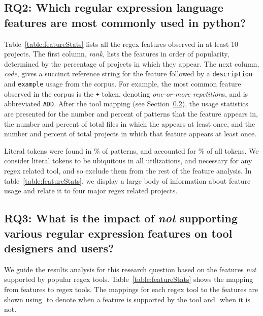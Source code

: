 \subsection{RQ2: Which regular expression language features are most commonly used in python?}
Table~\ref{table:featureStats}  lists all the regex features observed in at least 10 projects.
The first column, \emph{rank}, lists the features in order of popularity, determined by the percentage of projects in which they appear. The next column, \emph{code}, gives a succinct reference string for the feature followed by a {\tt description} and {\tt example} usage from the corpus. For example, the most common feature observed in the corpus is the {\tt +} token, denoting \emph{one-or-more repetition}s, and is abbreviated {\tt ADD}.
After the tool mapping (see Section~\ref{results:rq3}), the usage statistics are presented for the number and percent of patterns that the feature appears in, the number and percent of total files in which the appears at least once, and the number and percent of total projects in which that feature appears at least once.

Literal tokens were found in \% of patterns, and accounted for \% of all tokens.  We consider literal tokens to be ubiquitous in all utilizations, and necessary for any regex related tool, and so exclude them from the rest of the feature analysis.  In table~\ref{table:featureStats}, we display a large body of information about feature usage and relate it to four major regex related projects. 




	\subsection{{RQ3:} What is the impact of \emph{not} supporting various regular expression features on tool designers and users?}
	\label{results:rq3}

We guide the results analysis for this research question based on the features \emph{not} supported by popular regex tools.
Table~\ref{table:featureStats} shows the mapping from features to regex tools.
The mappings for each regex tool to the features are shown using \yes $ $ to denote when
a feature is supported by the tool and \no $ $ when it is not.




